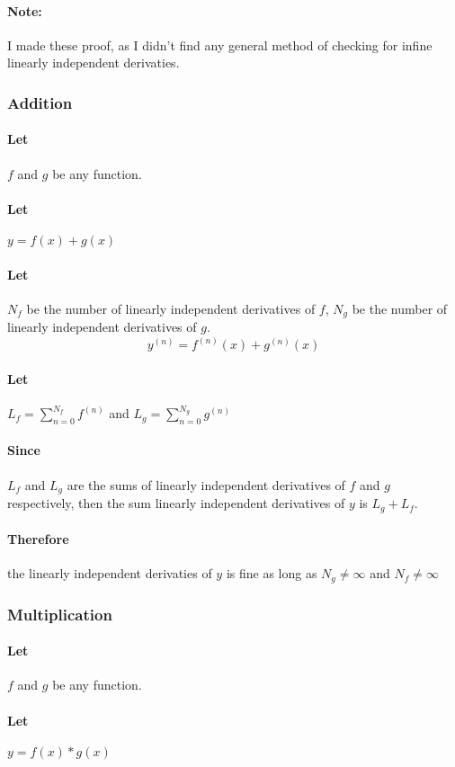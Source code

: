 \documentclass{article}
\begin{document}
\paragraph{Note: } I made these proof, as I didn't find any general method of checking for infine linearly independent derivaties.
\subsubsection{Addition}
\paragraph {Let} $f$ and $g$ be any function.
\paragraph {Let} $y = f(x) + g(x)$
\paragraph{Let} $N_f$ be the number of linearly independent derivatives of $f$, $N_g$ be the number of linearly independent derivatives of $g$.
$$y^{(n)}=f^{(n)}(x)+g^{(n)}(x)$$
\paragraph{Let} $L_f = \sum_{n=0}^{N_f} f^{(n)}$ and $L_g = \sum_{n=0}^{N_g} g^{(n)}$
\paragraph{Since} $L_f$ and $L_g$ are the sums of linearly independent derivatives of $f$ and $g$ respectively,
then the sum linearly independent derivatives of $y$ is $L_g + L_f$.
\paragraph{Therefore} the linearly independent derivaties of $y$ is fine as long as $N_g \neq \infty$ and $N_f \neq \infty$

\subsubsection{Multiplication}
\paragraph {Let} $f$ and $g$ be any function.
\paragraph {Let} $y = f(x) * g(x)$
\end{document}
